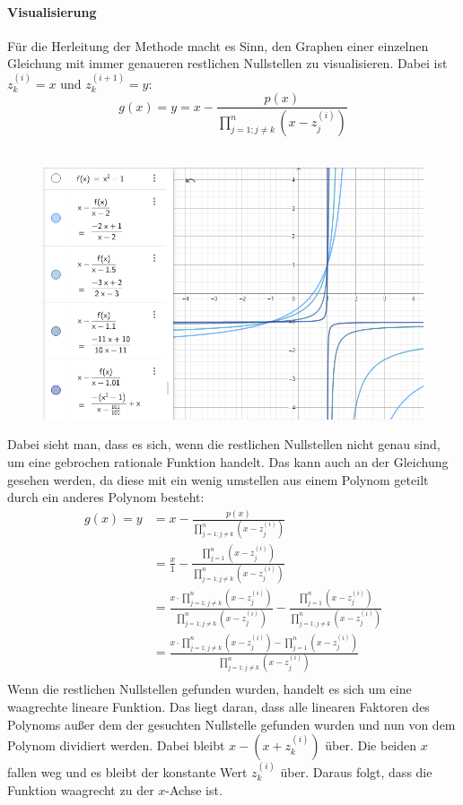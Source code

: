 \documentclass[12pt]{article}
\begin{document}
\paragraph{Visualisierung}
Für die Herleitung der Methode macht es Sinn, den Graphen einer einzelnen Gleichung mit immer genaueren restlichen Nullstellen zu visualisieren. Dabei ist $z_k^{(i)} = x$ und $z_k^{(i+1)} = y$:
\begin{equation}
    g(x) = y = x - \frac{p(x)}{\prod_{j=1;j\neq k}^{n} (x-z_j^{(i)})}
\end{equation}\\
\begin{figure}[H]
    \centering
    \includegraphics[scale=.6]{./BeispielHerleitung.png}
\end{figure}
Dabei sieht man, dass es sich, wenn die restlichen Nullstellen nicht genau sind, um eine gebrochen rationale Funktion handelt. Das kann auch an der Gleichung gesehen werden, da diese mit ein wenig umstellen aus einem Polynom geteilt durch ein anderes Polynom besteht:
\begin{align*}
    g(x) = y &= x - \frac{p(x)}{\prod_{j=1;j\neq k}^{n} (x-z_j^{(i)})} \\
    &= \frac{x}{1} - \frac{\prod_{j=1}^{n} (x-z_j^{(i)})}{\prod_{j=1;j\neq k}^{n} (x-z_j^{(i)})} \\
    &= \frac{x \cdot \prod_{j=1;j\neq k}^{n} (x-z_j^{(i)})}{\prod_{j=1;j\neq k}^{n} (x-z_j^{(i)})} - \frac{\prod_{j=1}^{n} (x-z_j^{(i)})}{\prod_{j=1;j\neq k}^{n} (x-z_j^{(i)})} \\
    &= \frac{x \cdot \prod_{j=1;j\neq k}^{n} (x-z_j^{(i)}) - \prod_{j=1}^{n} (x-z_j^{(i)})}{\prod_{j=1;j\neq k}^{n} (x-z_j^{(i)})} \\
\end{align*}
Wenn die restlichen Nullstellen gefunden wurden, handelt es sich um eine waagrechte lineare Funktion. Das liegt daran, dass alle linearen Faktoren des Polynoms außer dem der gesuchten Nullstelle gefunden wurden und nun von dem Polynom dividiert werden. Dabei bleibt $x-(x+z_k^{(i)})$ über. Die beiden $x$ fallen weg und es bleibt der konstante Wert $z_k^{(i)}$ über. Daraus folgt, dass die Funktion waagrecht zu der $x$-Achse ist.
\end{document}
